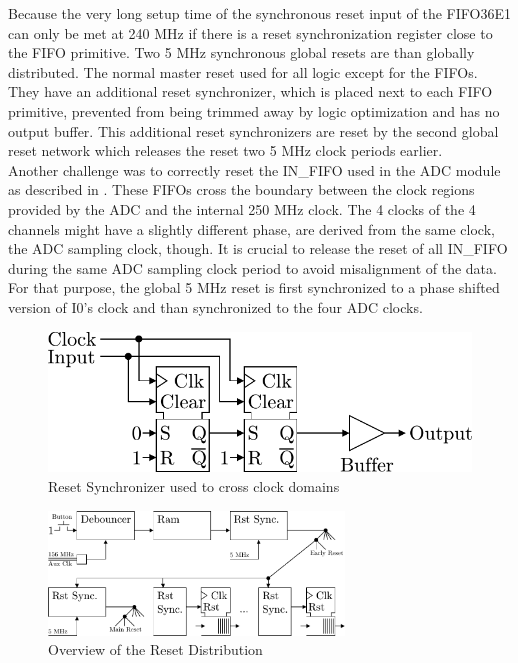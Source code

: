 Because the very long setup time of the synchronous reset input of the FIFO36E1
can only be met at 240 MHz if there is a reset synchronization register
close to the FIFO primitive. Two 5 MHz synchronous global resets are than
globally distributed. The normal master reset used for all logic except
for the \glspl{FIFO}. They have an additional reset synchronizer, which is
placed next to each \gls{FIFO} primitive, prevented from being trimmed
away by logic optimization and has no output buffer.
This additional reset synchronizers are reset by the second global reset network
which releases the reset two 5 MHz clock periods earlier.  \\

Another challenge was to correctly reset the IN\_FIFO used in the
\gls{ADC} module as described in . These \glspl{FIFO}
cross the boundary between the clock regions provided by the \gls{ADC} and
the internal 250 MHz clock. The 4 clocks of the 4 channels might
have a slightly different phase, are derived from the same clock, the
\gls{ADC} sampling clock, though. It is crucial to release the reset
of all IN\_FIFO during the same \gls{ADC} sampling clock period to avoid
misalignment of the data. For that purpose, the global 5 MHz
reset is first synchronized to a phase shifted version of I0's clock and
than synchronized to the four \gls{ADC} clocks. \\

\begin{figure}
  \centering
  \includegraphics{figures/RstSync}
  \caption{Reset Synchronizer used to cross clock domains}
  \label{fig:fpga_rst_sync}
\end{figure}

\begin{figure}
  \centering
  \includegraphics[width=0.7\textwidth]{figures/rst_generation}
  \caption{Overview of the Reset Distribution}
  \label{fig:fpga_rst_generation}
\end{figure}

